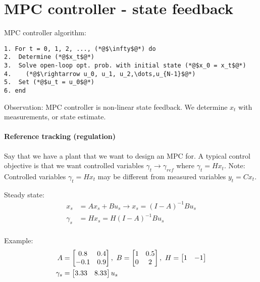 \documentclass{article}
\begin{document}
\maketitle

\section{MPC controller - state feedback}

MPC controller algorithm:

\lstset{basicstyle=\ttfamily}
\begin{lstlisting}
1. For t = 0, 1, 2, ..., (*@$\infty$@*) do
2.  Determine (*@$x_t$@*)
3.  Solve open-loop opt. prob. with initial state (*@$x_0 = x_t$@*)
4.    (*@$\rightarrow u_0, u_1, u_2,\dots,u_{N-1}$@*)
5.  Set (*@$u_t = u_0$@*)
6. end
\end{lstlisting}

\begin{center}
\end{center}

Observation: MPC controller is non-linear state feedback. We determine $x_t$ with measurements, or state estimate.

\paragraph{Reference tracking (regulation)}

Say that we have a plant that we want to design an MPC for. A typical control objective is that we want controlled variables $\gamma_t \rightarrow \gamma_{ref}$ where
$\gamma_t = H x_t$. Note: Controlled variables $\gamma_t = H x_t$ may be different from measured variables $y_t = Cx_t$.

\medskip Steady state:
\begin{align*}
  x_s      & = Ax_s + Bu_s \rightarrow x_s = (I - A)^{-1}Bu_s \\
  \gamma_s & = Hx_s = H(I - A)^{-1}Bu_s                       \\
\end{align*}

Example:
\begin{align*}
  A        & = \begin{bmatrix} 0.8  & 0.4      \\ -0.1 & 0.9 \end{bmatrix} ,\ B = \begin{bmatrix} 1 & 0.5 \\ 0 & 2 \end{bmatrix},\  H = \begin{bmatrix} 1 & -1 \end{bmatrix}  \\
  \gamma_s & = \begin{bmatrix} 3.33 & 8.33 \end{bmatrix}u_s
\end{align*}
\end{document}
